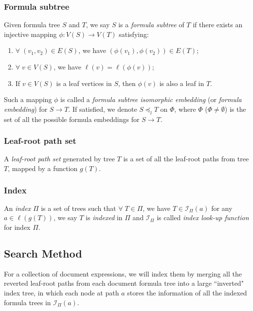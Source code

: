 \documentclass{acm_proc_article-sp}
\begin{document}
\subsubsection{Formula subtree}
\label{frmlsubtreeDef}
Given formula tree $S$ and $T$, we say $S$ is a \textit{formula subtree} of $T$ if there exists an injective mapping $\phi: V(S) \rightarrow V(T)$ satisfying:

\begin{enumerate}
\item 
$\forall\; (v_1,v_2) \in E(S)$, we have $(\phi(v_1),\phi(v_2)) \in E(T)$;
\item
$\forall\; v \in V(S)$, we have $\ell(v) = \ell(\phi(v))$;
\item
If $v \in V(S)$ is a leaf vertices in $S$, then $\phi(v)$ is also a leaf in $T$.
\end{enumerate}
Such a mapping $\phi$ is called a \textit{formula subtree isomorphic embedding} (or \textit{formula embedding}) for $S \rightarrow T$. 
If satisfied, we denote $S \preceq_l T$ on $\Phi$, where $\Phi$ ($\Phi \neq \emptyset$) is the set of all the possible formula embeddings for $S \rightarrow T$.

\subsubsection{Leaf-root path set}
A \textit{leaf-root path set} generated by tree $T$ is a set of all the leaf-root paths from tree $T$, mapped by a function $g(T)$. 

\subsubsection{Index}
An \textit{index} $\Pi$ is a set of trees such that $\forall\; T \in \Pi$, we have $T \in \mathcal{I}_{\Pi}(a)$ for any $a \in \ell(g(T))$, we say $T$ is \textit{indexed} in $\Pi$ and $\mathcal{I}_{\Pi}$ is called \textit{index look-up function} for index $\Pi$. 

\subsection{Search Method}
\label{se-method}
For a collection of document expressions, we will index them by merging all the reverted leaf-root paths from each document formula tree into a large ``inverted" index tree, 
in which each node at path $a$ stores the information of all the indexed formula trees in $\mathcal{I}_{\Pi}(a)$.
\end{document}
